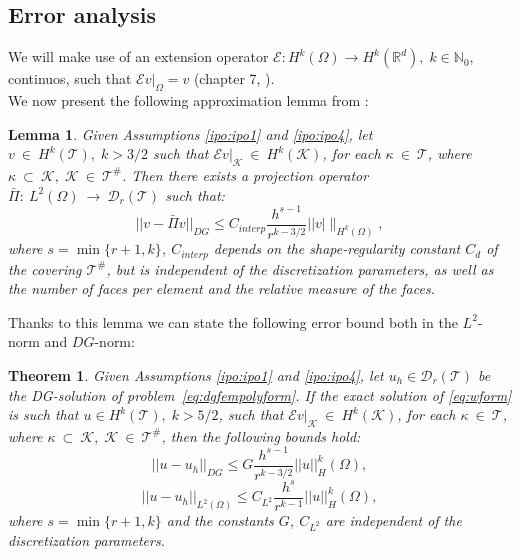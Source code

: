 \documentclass[12pt, a4paper]{article}
\theoremstyle{definition}
\theoremstyle{plain}
\newtheorem{lemma}{Lemma}
\theoremstyle{plain}
\newtheorem{teor}{Theorem}
\begin{document}
\subsection{Error analysis}
We will make use of an extension operator $\mathcal{E}:H^k(\Omega)\rightarrow H^k(\mathbb{R}^d), \; k\in\mathbb{N}_0$, continuos, such that $\mathcal{E}v|_\Omega=v$ (chapter 7, \cite{salsa}).\\
We now present the following approximation lemma from \cite{multigrid}:
\begin{lemma}  \label{lemma:interp}
	Given Assumptions \ref{ipo:ipo1} and \ref{ipo:ipo4}, let $v~\in~H^k(\mathcal{T}), \; k>3/2$ such that $\mathcal{E}v|_\mathcal{K}~\in~H^k(\mathcal{K})$, for each $\kappa~\in~\mathcal{T}$, where $\kappa~\subset~\mathcal{K}, \; \mathcal{K}~\in~\mathcal{T}^\#$. Then there exists a projection operator $\bar{\Pi}:~L^2(\Omega)~\rightarrow~\mathcal{D}_r(\mathcal{T})$ such that:
	\begin{equation}
		\big|\!\big| v - \bar{\Pi}v \big|\!\big|_{DG}
		\leq C_{interp} \frac{h^{s-1}}{r^{k-3/2}} |\!| v |\|_{H^k(\Omega)},
	\end{equation}
	where $s = \min \{r+1, k\}$, $C_{interp}$ depends on the shape-regularity constant $C_d$ of the covering $\mathcal{T}^\#$, but is independent of the discretization parameters, as well as the number of faces per element and the relative measure of the faces.
\end{lemma}
Thanks to this lemma we can state the following error bound both in the $L^2$-norm and $DG$-norm:
\begin{teor}
	Given Assumptions \ref{ipo:ipo1} and \ref{ipo:ipo4}, let $u_h \in \mathcal{D}_r(\mathcal{T})$ be the DG-solution of problem~\eqref{eq:dgfempolyform}. If the exact solution of \eqref{eq:wform} is such that $u\in H^k(\mathcal{T}), \; k>5/2$, such that $\mathcal{E}v|_\mathcal{K}~\in~H^k(\mathcal{K})$, for each $\kappa~\in~\mathcal{T}$, where $\kappa~\subset~\mathcal{K}, \; \mathcal{K}~\in~\mathcal{T}^\#$, then the following bounds hold:
	\begin{equation} \label{eq:dgbound}
		|\!|u-u_h|\!|_{DG} \leq G \frac{h^{s-1}}{r^{k-3/2}} |\!|u|\!|_H^k(\Omega),
	\end{equation}
	\begin{equation} \label{eq:l2bound}
		|\!|u-u_h|\!|_{L^2(\Omega)} \leq C_{L^2} \frac{h^s}{r^{k-1}} |\!|u|\!|_H^k(\Omega),
	\end{equation}
	where $s = \min \{r+1, k\}$ and the constants $G$, $C_{L^2}$ are independent of the discretization parameters.
\end{teor}
\end{document}
